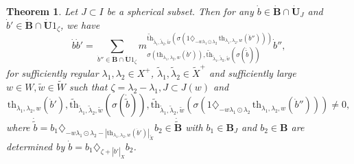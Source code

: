 \documentclass[10pt,a4paper]{amsart}
\newtheorem{theorem}{Theorem}
\def\l{\lambda}
\begin{document}
\begin{theorem}\label{thm:structure-multiplication}
Let $J \subset I$ be a spherical subset. Then for any $\dot{b}\in \dot{\mathbf{B}}\cap \dot{\mathbf{U}}_J$ and $\dot{b}'\in \dot{\mathbf{B}}\cap \dot{\mathbf{U}}1_{\zeta}$, we have
$$\dot{b}\dot{b}'=\sum_{\dot{b}''\in \dot{\mathbf{B}}\cap \dot{\mathbf{U}}1_{\zeta}}m_{\sigma(\mathrm{th}_{\lambda_1,\lambda_2,w}(\dot{b}')),\widetilde{\mathrm{th}}_{\tilde{\lambda}_1,\tilde{\lambda}_2,\tilde{w}}(\sigma(\dot{\tilde{b}}))}^{\widetilde{\mathrm{th}}_{\tilde{\lambda}_1,\tilde{\lambda}_2,\tilde{w}}(\sigma(1\diamondsuit_{-w\lambda_1\odot\lambda_2}\,\mathrm{th}_{\lambda_1,\lambda_2,w}(\dot{b}'')))}\dot{b}'',$$
for sufficiently regular $\l_1, \l_2 \in X^+$, $\tilde{\lambda}_1,\tilde{\lambda}_2\in \tilde{X}^+$ and sufficiently large $w\in W,\tilde{w}\in \tilde{W}$ such that $\zeta=\lambda_2-\lambda_1,J\subset J(w)$ and $$\mathrm{th}_{\lambda_1,\lambda_2,w}(\dot{b}'),\widetilde{\mathrm{th}}_{\tilde{\lambda}_1,\tilde{\lambda}_2,\tilde{w}}(\sigma(\dot{\tilde{b}})),\widetilde{\mathrm{th}}_{\tilde{\lambda}_1,\tilde{\lambda}_2,\tilde{w}}(\sigma(1\diamondsuit_{-w\lambda_1\odot\lambda_2}\,\mathrm{th}_{\lambda_1,\lambda_2,w}(\dot{b}'')))\neq 0,$$
where $\dot{\tilde{b}}=b_1\diamondsuit_{-w\lambda_1\odot\lambda_2-|\mathrm{th}_{\lambda_1,\lambda_2,w}(\dot{b}')|_{\tilde{X}}}b_2\in \dot{\tilde{\mathbf{B}}}$ with $b_1\in \mathbf{B}_J$ and $b_2\in \mathbf{B}$ are determined by $\dot{b}=b_1\diamondsuit_{\zeta+|\dot{b}'|_X}b_2$.
\end{theorem} 
\end{document}
